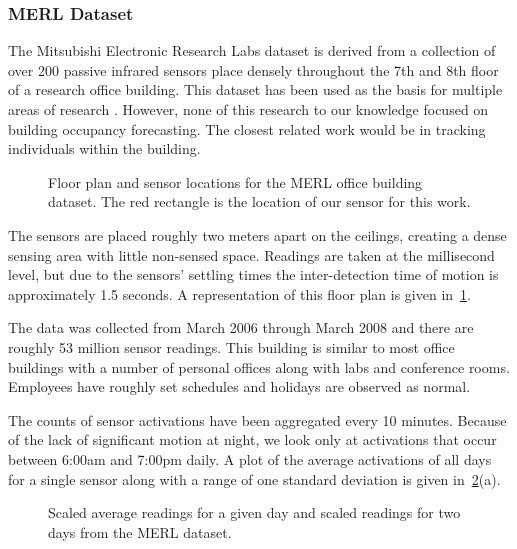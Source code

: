 \subsubsection{MERL Dataset} 
The Mitsubishi Electronic Research Labs dataset is derived from a collection of over 200 passive infrared sensors place densely throughout the 7th and 8th floor of a research office building.  This dataset has been used as the basis for multiple areas of research \cite{Wren2003, Wren2006, Wren2007a, Dong2011, Minnen2004, Wren2006a, Wren2007}.  However, none of this research to our knowledge focused on building occupancy forecasting.  The closest related work would be in tracking individuals within the building.

\begin{figure}[!ht]
	\begin{center}
	\end{center}
	\caption{Floor plan and sensor locations for the MERL office building dataset.  The red rectangle is the location of our sensor for this work.}
	\label{fig:merlfloor}
\end{figure}

The sensors are placed roughly two meters apart on the ceilings, creating a dense sensing area with little non-sensed space.  Readings are taken at the millisecond level, but due to the sensors' settling times the inter-detection time of motion is approximately 1.5 seconds.  A representation of this floor plan is given in~\ref{fig:merlfloor}.

The data was collected from March 2006 through March 2008 and there are roughly 53 million sensor readings.  This building is similar to most office buildings with a number of personal offices along with labs and conference rooms.  Employees have roughly set schedules and holidays are observed as normal. 

The counts of sensor activations have been aggregated every 10 minutes.  Because of the lack of significant motion at night, we look only at activations that occur between 6:00am and 7:00pm daily.  A plot of the average activations of all days for a single sensor along with a range of one standard deviation is given in~\ref{fig:merl_scaled}(a).

\begin{figure}[!ht]
	\begin{center}
	\end{center}
	\caption{Scaled average readings for a given day and scaled readings for two days from the MERL dataset.}
	\label{fig:merl_scaled}
\end{figure}

